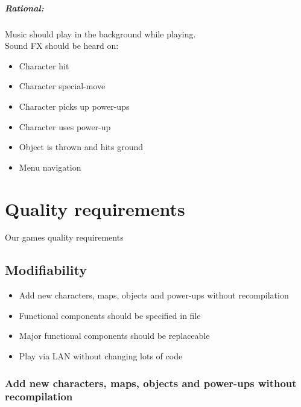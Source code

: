 	\paragraph{Rational:}
		Music should play in the background while playing.\\
		Sound FX should  be heard on:
		\begin{itemize}
			\item Character hit
			\item Character special-move
			\item Character picks up power-ups
			\item Character uses power-up
			\item Object is thrown and hits ground
			\item Menu navigation
		\end{itemize}

\chapter{Quality requirements}
Our games quality requirements
\section{Modifiability}
	\begin{itemize}
		\item Add new characters, maps, objects and power-ups without recompilation
		\item Functional components should be specified in file
		\item Major functional components should be replaceable
		\item Play via LAN without changing lots of code
	\end{itemize}
	
\subsection{Add new characters, maps, objects and power-ups without recompilation}
	\begin{itemize}
	\end{itemize}
	
